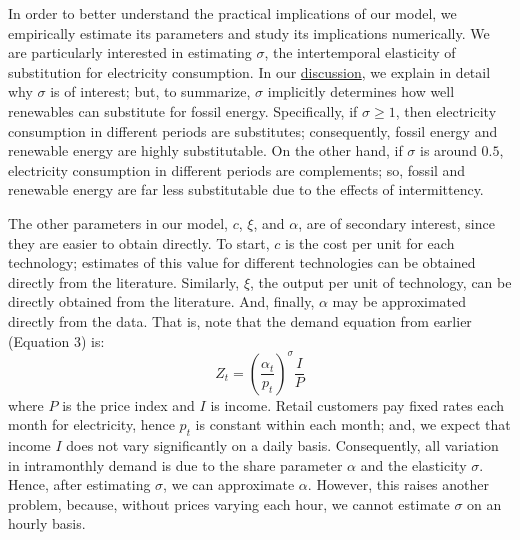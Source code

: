 \documentclass[11pt,a4paper]{extarticle}
\begin{document}
In order to better understand the practical implications of our model, we empirically estimate its parameters and study its implications numerically. We are particularly interested in estimating $\sigma$, the intertemporal elasticity of substitution for electricity consumption. In our  \hyperref[sec:Discussion]{discussion}, we explain in detail why $\sigma$ is of interest; but, to summarize, $\sigma$ implicitly determines how well renewables can substitute for fossil energy. Specifically, if $\sigma \geq 1$, then electricity consumption in different periods are substitutes; consequently, fossil energy and renewable energy are highly substitutable. On the other hand, if $\sigma$ is around $0.5$, electricity consumption in different periods are complements; so, fossil and renewable energy are far less substitutable due to the effects of intermittency. 

The other parameters in our model, $c$,  $\xi$, and $\alpha$, are of secondary interest, since they are easier to obtain directly. To start, $c$ is the cost per unit for each technology; estimates of this value for different technologies can be obtained directly from the literature. Similarly, $\xi$, the output per unit of technology, can be directly obtained from the literature. And, finally, $\alpha$ may be approximated directly from the data. That is, note that the demand equation from earlier (Equation 3) is:
$$Z_t = \left(\frac{\alpha_t}{p_t} \right)^\sigma \frac{I}{P}$$
where $P$ is the price index and $I$ is income. Retail customers pay fixed rates each month for electricity, hence $p_t$ is constant within each month; and, we expect that income $I$ does not vary significantly on a daily basis. Consequently, all variation in intramonthly demand is due to the share parameter $\alpha$ and the elasticity $\sigma$. Hence, after estimating $\sigma$, we can approximate $\alpha$. However, this raises another problem, because, without prices varying each hour, we cannot estimate  $\sigma$ on an hourly basis. 
\end{document}
